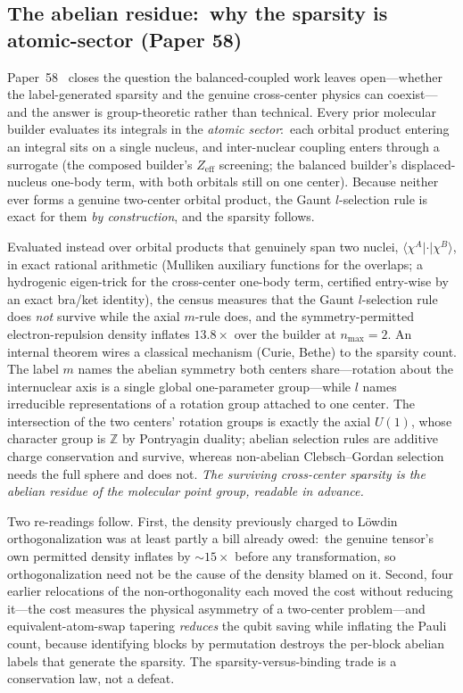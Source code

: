 \documentclass[aps,pra,twocolumn,superscriptaddress,longbibliography]{revtex4-2}
\begin{document}
\subsection{The abelian residue:\ why the sparsity is atomic-sector (Paper 58)}

Paper~58~\cite{loutey_paper58} closes the question the balanced-coupled
work leaves open---whether the label-generated sparsity and the genuine
cross-center physics can coexist---and the answer is group-theoretic
rather than technical.  Every prior molecular builder evaluates its
integrals in the \emph{atomic sector}:\ each orbital product entering an
integral sits on a single nucleus, and inter-nuclear coupling enters
through a surrogate (the composed builder's $Z_{\mathrm{eff}}$ screening;
the balanced builder's displaced-nucleus one-body term, with both
orbitals still on one center).  Because neither ever forms a genuine
two-center orbital product, the Gaunt $l$-selection rule is exact for
them \emph{by construction}, and the sparsity follows.

Evaluated instead over orbital products that genuinely span two nuclei,
$\langle \chi^A | \cdot | \chi^B \rangle$, in exact rational arithmetic
(Mulliken auxiliary functions for the overlaps; a hydrogenic eigen-trick
for the cross-center one-body term, certified entry-wise by an exact
bra/ket identity), the census measures that the Gaunt $l$-selection rule
does \emph{not} survive while the axial $m$-rule does, and the
symmetry-permitted electron-repulsion density inflates $13.8\times$ over
the builder at $n_{\max}=2$.  An internal theorem wires a classical mechanism
(Curie, Bethe) to the sparsity count.
The label $m$ names the abelian symmetry both centers share---rotation
about the internuclear axis is a single global one-parameter
group---while $l$ names irreducible representations of a rotation group
attached to one center.  The intersection of the two centers' rotation
groups is exactly the axial $U(1)$, whose character group is $\mathbb{Z}$
by Pontryagin duality; abelian selection rules are additive charge
conservation and survive, whereas non-abelian Clebsch--Gordan selection
needs the full sphere and does not.  \emph{The surviving cross-center
sparsity is the abelian residue of the molecular point group, readable in
advance.}

Two re-readings follow.  First, the density previously charged to
L\"owdin orthogonalization was at least partly a bill already owed:\ the
genuine tensor's own permitted density inflates by $\sim\!15\times$ before
any transformation, so orthogonalization need not be the cause of the
density blamed on it.  Second, four earlier relocations of the non-orthogonality each moved
the cost without reducing it---the cost measures the physical asymmetry
of a two-center problem---and equivalent-atom-swap tapering \emph{reduces}
the qubit saving while inflating the Pauli count, because identifying
blocks by permutation destroys the per-block abelian labels that generate
the sparsity.  The sparsity-versus-binding trade is a conservation law,
not a defeat.
\end{document}
